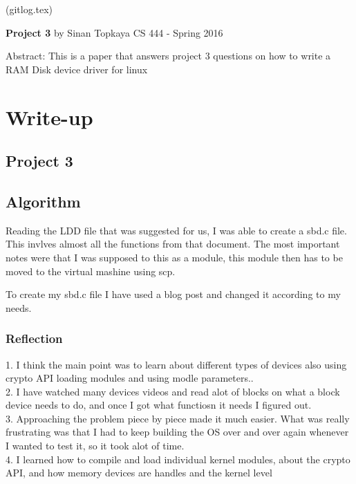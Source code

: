\documentclass[letterpaper,10pt,draftclsnofoot,onecolumn]{IEEEtran}
\begin{document}
	(gitlog.tex)
	\begin{titlepage}
		
		\begin{center}
		\bigbreak	
		\textbf{Project 3}
		\bigbreak
		by Sinan Topkaya
		\smallbreak
		CS 444 - Spring 2016
		\end{center}
		\vfill
		
		Abstract: This is a paper that answers project 3 questions on how to write a RAM Disk device driver for linux	
	\end{titlepage}

\section*{Write-up}
\subsection*{Project 3}


\subsection*{Algorithm}

Reading the LDD file that was suggested for us, I was able to create a sbd.c file. This invlves almost all the functions from that document. The most important notes were that I was supposed to this as a module, this module then has to be moved to the virtual mashine using scp.

To create my sbd.c file I have used a blog post and changed it according to my needs.

\subsubsection*{Reflection}
	1. I think the main point was to learn about different types of devices also using crypto API loading modules and using modle parameters..\\
	2. I have watched many devices videos and read alot of blocks on what a block device needs to do, and once I got what functiosn it needs I figured out.\\
	3. Approaching the problem piece by piece made it much easier. What was really frustrating was that I had to keep building the OS over and over again whenever I wanted to test it, so it took alot of time.\\
	4. I learned how to compile and load individual kernel modules, about the crypto API, and how memory devices are handles and the kernel level\\
\end{document}
